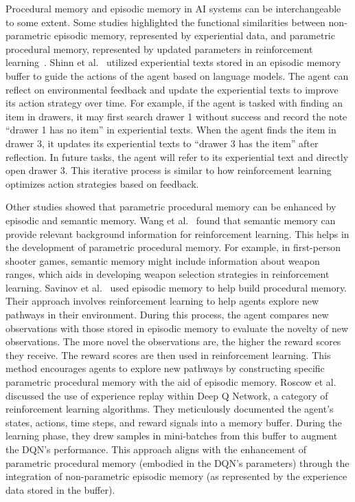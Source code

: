 \documentclass[journal,hideappendix]{vgtc}
\begin{document}
Procedural memory and episodic memory in AI systems can be interchangeable to some extent. Some studies highlighted the functional similarities between non-parametric episodic memory, represented by experiential data, and parametric procedural memory, represented by updated parameters in reinforcement learning~\cite{sumers2023cognitive, shinn2024reflexion}. Shinn et al.~\cite{shinn2024reflexion} utilized experiential texts stored in an episodic memory buffer to guide the actions of the agent based on language models. The agent can reflect on environmental feedback and update the experiential texts to improve its action strategy over time. For example, if the agent is tasked with finding an item in drawers, it may first search drawer 1 without success and record the note ``drawer 1 has no item'' in experiential texts. When the agent finds the item in drawer 3, it updates its experiential texts to ``drawer 3 has the item'' after reflection. In future tasks, the agent will refer to its experiential text and directly open drawer 3. This iterative process is similar to how reinforcement learning optimizes action strategies based on feedback. 

Other studies showed that parametric procedural memory can be enhanced by episodic and semantic memory. Wang et al.~\cite{wang2016semantic} found that semantic memory can provide relevant background information for reinforcement learning. This helps in the development of parametric procedural memory. For example, in first-person shooter games, semantic memory might include information about weapon ranges, which aids in developing weapon selection strategies in reinforcement learning. Savinov et al.~\cite{savinov2019episodic} used episodic memory to help build procedural memory. Their approach involves reinforcement learning to help agents explore new pathways in their environment. During this process, the agent compares new observations with those stored in episodic memory to evaluate the novelty of new observations. The more novel the observations are, the higher the reward scores they receive. The reward scores are then used in reinforcement learning. This method encourages agents to explore new pathways by constructing specific parametric procedural memory with the aid of episodic memory. Roscow et al.~\cite{roscow2021learning} discussed the use of experience replay within Deep Q Network, a category of reinforcement learning algorithms. They meticulously documented the agent's states, actions, time steps, and reward signals into a memory buffer. During the learning phase, they drew samples in mini-batches from this buffer to augment the DQN's performance. This approach aligns with the enhancement of parametric procedural memory (embodied in the DQN's parameters) through the integration of non-parametric episodic memory (as represented by the experience data stored in the buffer).
\end{document}
